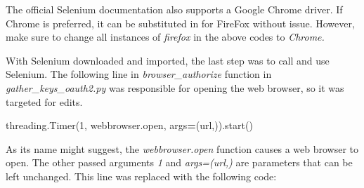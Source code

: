 \documentclass[]{book}
\newenvironment{Shaded}{\begin{snugshade}}{\end{snugshade}}
\newcommand{\BuiltInTok}[1]{#1}
\newcommand{\DecValTok}[1]{\textcolor[rgb]{0.00,0.00,0.81}{#1}}
\newcommand{\NormalTok}[1]{#1}
\newcommand{\OperatorTok}[1]{\textcolor[rgb]{0.81,0.36,0.00}{\textbf{#1}}}
\newcommand{\SpecialCharTok}[1]{\textcolor[rgb]{0.00,0.00,0.00}{#1}}
\newcommand{\StringTok}[1]{\textcolor[rgb]{0.31,0.60,0.02}{#1}}
\begin{document}
The official Selenium documentation also supports a Google Chrome driver. If Chrome is preferred, it can be substituted in for FireFox without issue. However, make sure to change all instances of \emph{firefox} in the above codes to \emph{Chrome.}

With Selenium downloaded and imported, the last step was to call and use Selenium. The following line in \emph{browser\_authorize} function in \emph{gather\_keys\_oauth2.py} was responsible for opening the web browser, so it was targeted for edits.

\begin{Shaded}
\begin{Highlighting}[]
\NormalTok{    threading.Timer(}\DecValTok{1}\NormalTok{, webbrowser.}\BuiltInTok{open}\NormalTok{, args}\OperatorTok{=}\NormalTok{(url,)).start()}
\end{Highlighting}
\end{Shaded}

As its name might suggest, the \emph{webbrowser.open} function causes a web browser to open. The other passed arguments \emph{1} and \emph{args=(url,)} are parameters that can be left unchanged. This line was replaced with the following code:

\begin{Shaded}
\end{Shaded}
\end{document}

